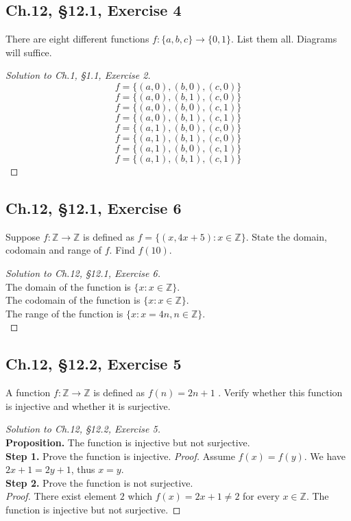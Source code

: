 \documentclass[12pt]{amsart}
\numberwithin{equation}{section}
\theoremstyle{definition}
\theoremstyle{remark}
\begin{document}
\subsection*{Ch.12, \S 12.1,  Exercise 4} There are eight different functions $ f : \{a, b, c \} \rightarrow \{0, 1 \} $. List them all. Diagrams will suffice.

\begin{proof}[Solution to Ch.1, \S 1.1,  Exercise 2] 
$$ f = \{(a, 0), (b, 0), (c, 0) \} $$
$$ f = \{(a, 0), (b, 1), (c, 0) \} $$
$$ f = \{(a, 0), (b, 0), (c, 1) \} $$
$$ f = \{(a, 0), (b, 1), (c, 1) \} $$
$$ f = \{(a, 1), (b, 0), (c, 0) \} $$
$$ f = \{(a, 1), (b, 1), (c, 0) \} $$
$$ f = \{(a, 1), (b, 0), (c, 1) \} $$
$$ f = \{(a, 1), (b, 1), (c, 1) \} $$
\end{proof}




\subsection*{Ch.12, \S 12.1,  Exercise 6}  Suppose $ f : \mathbb{Z} \rightarrow \mathbb{Z} $ is defined as $ f = \{(x, 4x + 5) : x \in \mathbb{Z} \} $. State the domain, codomain and range of $ f $. Find $ f(10) $.

\begin{proof}[Solution to Ch.12, \S 12.1,  Exercise 6] \ \\
The domain of the function is $ \{ x : x \in \mathbb{Z} \} $. \\
The codomain of the function is $ \{ x : x \in \mathbb{Z} \} $. \\
The range of the function is $ \{ x : x = 4n , n \in \mathbb{Z} \} $. \\

\end{proof}




\subsection*{Ch.12, \S 12.2,  Exercise 5}  A function $ f : \mathbb{Z} \rightarrow \mathbb{Z} $ is defined as $ f(n) = 2n + 1 $ . Verify whether this function is injective and whether it is surjective.

\begin{proof}[Solution to Ch.12, \S 12.2,  Exercise 5] \ \\
\textbf{Proposition.} The function is injective but not surjective.\\
\textbf{Step 1.} Prove the function is injective.
\textit{Proof.} Assume $ f(x) = f(y) $. We have $ 2x + 1 = 2y + 1 $, thus $ x = y $.\\
\textbf{Step 2.} Prove the function is not surjective.\\
\textit{Proof.} There exist element $ 2 $ which $ f(x) = 2x + 1 \neq 2 $ for every $ x \in \mathbb{Z} $. The function is injective but not surjective.
\end{proof}
\end{document}
